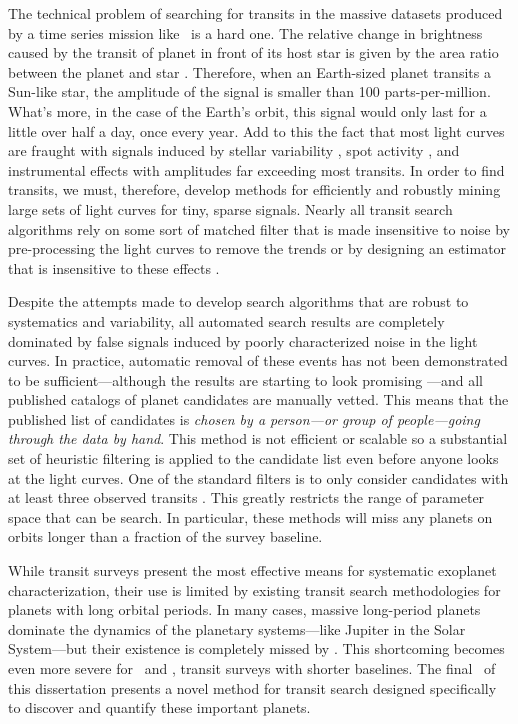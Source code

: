 The technical problem of searching for transits in the massive datasets
produced by a time series mission like \kepler\ is a hard one.
The relative change in brightness caused by the transit of planet in front of
its host star is given by the area ratio between the planet and star
\citep{Winn:2010}.
Therefore, when an Earth-sized planet transits a Sun-like star, the amplitude
of the signal is smaller than 100 parts-per-million.
What's more, in the case of the Earth's orbit, this signal would only last for
a little over half a day, once every year.
Add to this the fact that most light curves are fraught with signals induced
by stellar variability \citep{Basri:2013}, spot activity
\citep{McQuillan:2014}, and instrumental effects \citep{Stumpe:2012,
Smith:2012} with amplitudes far exceeding most transits.
In order to find transits, we must, therefore, develop methods for efficiently
and robustly mining large sets of light curves for tiny, sparse signals.
Nearly all transit search algorithms rely on some sort of matched filter that
is made insensitive to noise by pre-processing the light curves to remove the
trends or by designing an estimator that is insensitive to these effects
\citep[][]{Kovacs:2002, Kovacs:2005, Berta:2012, Petigura:2013,
Foreman-Mackey:2015}.

Despite the attempts made to develop search algorithms that are robust to
systematics and variability, all automated search results are completely
dominated by false signals induced by poorly characterized noise in the light
curves.
In practice, automatic removal of these events has not been demonstrated to be
sufficient---although the results are starting to look promising
\citep{Jenkins:2014}---and all published catalogs of planet candidates are
manually vetted.
This means that the published list of candidates is \emph{chosen by a
person---or group of people---going through the data by hand}.
This method is not efficient or scalable so a substantial set of heuristic
filtering is applied to the candidate list even before anyone looks at the
light curves.
One of the standard filters is to only consider candidates with at least three
observed transits \citep[for example][]{Petigura:2013, Burke:2014, Rowe:2015}.
This greatly restricts the range of parameter space that can be search.
In particular, these methods will miss any planets on orbits longer than a
fraction of the survey baseline.

While transit surveys present the most effective means for systematic
exoplanet characterization, their use is limited by existing transit search
methodologies for planets with long orbital periods.
In many cases, massive long-period planets dominate the dynamics of the
planetary systems---like Jupiter in the Solar System---but their existence is
completely missed by \kepler.
This shortcoming becomes even more severe for \KT\ and \tess, transit surveys
with shorter baselines.
The final \chapname\ of this dissertation presents a novel method for transit
search designed specifically to discover and quantify these important planets.

